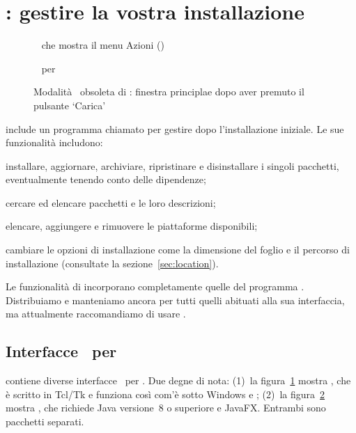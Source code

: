 \documentclass{article}
\begin{document}
\section{: gestire la vostra installazione}
\label{sec:tlmgr}

\begin{figure}[tb]
\caption{\GUI\  che mostra il menu Azioni (\MacOSX)}
\label{fig:tlshell}
\end{figure}

\begin{figure}[tb]
\caption{\GUI\  per }
\label{fig:tlcockpit}
\end{figure}

\begin{figure}[tb]
\caption{Modalità \GUI\ obsoleta di : finestra principlae dopo aver
  premuto il pulsante `Carica'}
\label{fig:tlmgr-gui}
\end{figure}

\TL{} include un programma chiamato  per gestire \TL{} dopo
l'installazione iniziale. Le sue funzionalità includono:

\begin{itemize*}
\item installare, aggiornare, archiviare, ripristinare e disinstallare i
  singoli pacchetti, eventualmente tenendo conto delle dipendenze;
\item cercare ed elencare pacchetti e le loro descrizioni;
\item elencare, aggiungere e rimuovere le piattaforme disponibili;
\item cambiare le opzioni di installazione come la dimensione del foglio e
  il percorso di installazione (consultate la sezione~\ref{sec:location}).
\end{itemize*}

Le funzionalità di  incorporano completamente quelle del
programma . Distribuiamo e manteniamo ancora
 per tutti quelli abituati alla sua interfaccia, ma
attualmente raccomandiamo di usare .

\subsection{Interfacce \GUI\ per }

\TL{} contiene diverse interfacce \GUI\ per . Due degne di nota:
(1)~la figura~\ref{fig:tlshell} mostra , che è scritto in Tcl/Tk
e funziona così com'è sotto Windows e \MacOSX; (2)~la figura~\ref{fig:tlcockpit}
mostra , che richiede Java versione~8 o superiore e JavaFX.
Entrambi sono pacchetti separati.
\end{document}
